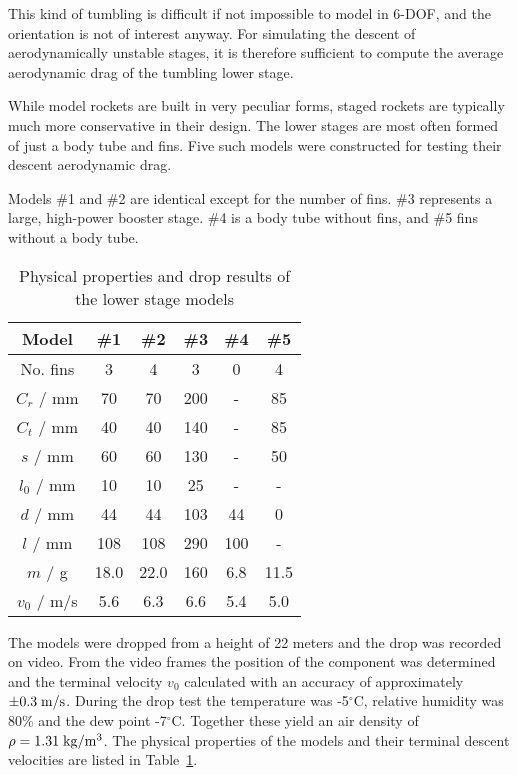 This kind of tumbling is difficult if not impossible to model in
6-DOF, and the orientation is not of interest anyway.
For simulating the descent of aerodynamically unstable stages, it is
therefore sufficient to compute the average aerodynamic drag of
the tumbling lower stage.

While model rockets are built in very peculiar forms, staged rockets
are typically much more conservative in their design.  The lower
stages are most often formed of just a body tube and fins.  Five such
models were constructed for testing their descent aerodynamic drag.

Models \#1 and \#2 are identical except for the number of fins.  \#3
represents a large, high-power booster stage.  \#4 is a body tube
without fins, and \#5 fins without a body tube.

\begin{table}
\caption{Physical properties and drop results of the lower stage models}
\label{tab-lower-stages}
\begin{center}
\parbox{80mm}{
\begin{tabular}{cccccc}
Model       & \#1 & \#2 & \#3 & \#4 & \#5 \\
\hline
No. fins    & 3   & 4   & 3   & 0   & 4    \\
$C_r$ / mm  & 70  & 70  & 200 & -   & 85   \\
$C_t$ / mm  & 40  & 40  & 140 & -   & 85   \\
$s$ / mm    & 60  & 60  & 130 & -   & 50   \\
$l_0$ / mm  & 10  & 10  & 25  & -   & -    \\
$d$ / mm    & 44  & 44  & 103 & 44  & 0    \\
$l$ / mm    & 108 & 108 & 290 & 100 & -    \\
$m$ / g     & 18.0& 22.0& 160 & 6.8 & 11.5 \\
\hline
$v_0$ / m/s & 5.6 & 6.3 & 6.6 & 5.4 & 5.0  \\
\end{tabular}
}
\parbox{50mm}{
}
\end{center}
\end{table}

The models were dropped from a height of 22 meters and the drop
was recorded on video.  From the video frames the position of
the component was determined and the terminal velocity $v_0$
calculated with an accuracy of approximately $\pm 0.3\;\rm m/s$.
During the drop test the temperature was -5$^\circ$C, relative
humidity was 80\% and the dew point -7$^\circ$C.  Together these yield
an air density of $\rho = 1.31\rm\;kg/m^3$.  The physical properties
of the models and their terminal descent velocities are listed in
Table~\ref{tab-lower-stages}.

